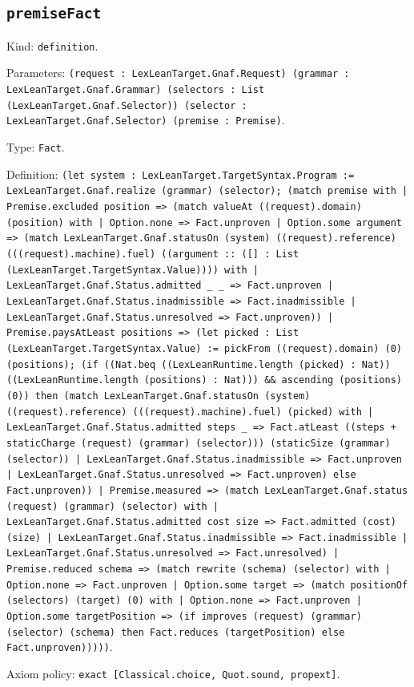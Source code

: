 \documentclass[11pt]{article}
\begin{document}
\subsection*{\texttt{premiseFact}}
\noindent Kind: \texttt{definition}.\par
\noindent Parameters: \texttt{(request : LexLeanTarget.Gnaf.Request) (grammar : LexLeanTarget.Gnaf.Grammar) (selectors : List (LexLeanTarget.Gnaf.Selector)) (selector : LexLeanTarget.Gnaf.Selector) (premise : Premise)}.\par
\noindent Type: \texttt{Fact}.\par
\noindent Definition: \texttt{(let system : LexLeanTarget.TargetSyntax.Program := LexLeanTarget.Gnaf.realize (grammar) (selector); (match premise with | Premise.excluded position => (match valueAt ((request).domain) (position) with | Option.none => Fact.unproven | Option.some argument => (match LexLeanTarget.Gnaf.statusOn (system) ((request).reference) (((request).machine).fuel) ((argument :: ([] : List (LexLeanTarget.TargetSyntax.Value)))) with | LexLeanTarget.Gnaf.Status.admitted \_ \_ => Fact.unproven | LexLeanTarget.Gnaf.Status.inadmissible => Fact.inadmissible | LexLeanTarget.Gnaf.Status.unresolved => Fact.unproven)) | Premise.paysAtLeast positions => (let picked : List (LexLeanTarget.TargetSyntax.Value) := pickFrom ((request).domain) (0) (positions); (if ((Nat.beq ((LexLeanRuntime.length (picked) : Nat)) ((LexLeanRuntime.length (positions) : Nat))) \&\& ascending (positions) (0)) then (match LexLeanTarget.Gnaf.statusOn (system) ((request).reference) (((request).machine).fuel) (picked) with | LexLeanTarget.Gnaf.Status.admitted steps \_ => Fact.atLeast ((steps + staticCharge (request) (grammar) (selector))) (staticSize (grammar) (selector)) | LexLeanTarget.Gnaf.Status.inadmissible => Fact.unproven | LexLeanTarget.Gnaf.Status.unresolved => Fact.unproven) else Fact.unproven)) | Premise.measured => (match LexLeanTarget.Gnaf.status (request) (grammar) (selector) with | LexLeanTarget.Gnaf.Status.admitted cost size => Fact.admitted (cost) (size) | LexLeanTarget.Gnaf.Status.inadmissible => Fact.inadmissible | LexLeanTarget.Gnaf.Status.unresolved => Fact.unresolved) | Premise.reduced schema => (match rewrite (schema) (selector) with | Option.none => Fact.unproven | Option.some target => (match positionOf (selectors) (target) (0) with | Option.none => Fact.unproven | Option.some targetPosition => (if improves (request) (grammar) (selector) (schema) then Fact.reduces (targetPosition) else Fact.unproven)))))}.\par
\noindent Axiom policy: \texttt{exact [Classical.choice, Quot.sound, propext]}.\par
\end{document}
